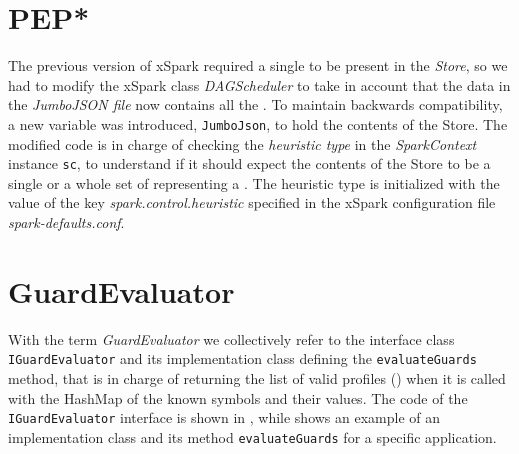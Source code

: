 \section{PEP*}\label{sec:getting_peps}
The previous version of xSpark required a single \plan to be present in the \textit{\model  Store}, so we had to modify the xSpark class \textit{DAGScheduler} to take in account that the data in the \textit{JumboJSON file} now contains all the \plans. To maintain backwards compatibility, a new variable was introduced, \texttt{JumboJson}, to hold the contents of the \model Store. The modified code is in charge of checking the \textit{heuristic type} in the \textit{SparkContext} instance \texttt{sc}, to understand if it should expect the contents of the \model Store to be a single \plan or a whole set of \plans representing a \model. The heuristic type is initialized with the value of the key \textit{spark.control.heuristic} specified in the xSpark configuration file \textit{spark-defaults.conf}. 



\section{GuardEvaluator}\label{sec:guard_evaluator}
With the term \textit{GuardEvaluator} we collectively refer to the interface class \texttt{IGuardEvaluator} and its implementation class defining the \texttt{evaluateGuards} method, that is in charge of returning the list of valid profiles (\plans) when it is called with the HashMap of the known symbols and their values. The code of the  \texttt{IGuardEvaluator} interface is shown in , while  shows an example of an implementation class and its method \texttt{evaluateGuards} for a specific application.
\vspace{-1.5cm}

\vspace{1.5cm}



